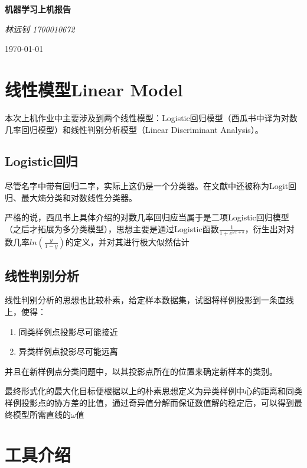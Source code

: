 \documentclass[UTF8]{ctexart}
\begin{document}
	\begin{titlepage}
		\vspace*{\fill}
		\begin{center}
			\normalfont
			{\Huge \bfseries 机器学习上机报告}
			
			\bigskip
			
			{\Large \itshape 林远钊 1700010672}
			
			\medskip
			
			\today
		\end{center}
	\end{titlepage}
	\newpage
	\tableofcontents
	
	\newpage
\section{线性模型Linear Model}
本次上机作业中主要涉及到两个线性模型：Logistic回归模型（西瓜书中译为对数几率回归模型）和线性判别分析模型（Linear Discriminant Analysis）。

\subsection{Logistic回归}
尽管名字中带有回归二字，实际上这仍是一个分类器。在文献中还被称为Logit回归、最大熵分类和对数线性分类器。

严格的说，西瓜书上具体介绍的对数几率回归应当属于是二项Logistic回归模型（之后才拓展为多分类模型），思想主要是通过Logistic函数$ \frac{1}{1+e^{\omega x +b}} $，衍生出对对数几率$ ln(\frac{y}{1-y}) $的定义，并对其进行极大似然估计

\subsection{线性判别分析}
线性判别分析的思想也比较朴素，给定样本数据集，试图将样例投影到一条直线上，使得：
\begin{enumerate}[i]
	\item 同类样例点投影尽可能接近
	\item 异类样例点投影尽可能远离
\end{enumerate}
并且在新样例点分类问题中，以其投影点所在的位置来确定新样本的类别。

最终形式化的最大化目标便根据以上的朴素思想定义为异类样例中心的距离和同类样例投影点的协方差的比值，通过奇异值分解而保证数值解的稳定后，可以得到最终模型所需直线的$ \omega $值
\section{工具介绍}
\end{document}

